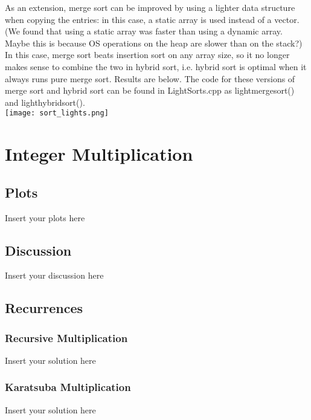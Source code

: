 \documentclass[a4paper]{article}
\begin{document}
As an extension, merge sort can be improved by using a lighter data structure when copying the entries: in this case, a static array is used instead of a vector. (We found that using a static array was faster than using a dynamic array. Maybe this is because OS operations on the heap are slower than on the stack?) In this case, merge sort beats insertion sort on any array size, so it no longer makes sense to combine the two in hybrid sort, i.e. hybrid sort is optimal when it always runs pure merge sort. Results are below. The code for these versions of merge sort and hybrid sort can be found in LightSorts.cpp as lightmergesort() and lighthybridsort().\\

\texttt{[image: sort\_lights.png]}


\section{Integer Multiplication}

\subsection{Plots}

\noindent Insert your plots here

\subsection{Discussion}

\noindent Insert your discussion here

\subsection{Recurrences}

\subsubsection{Recursive Multiplication}

\noindent Insert your solution here

\subsubsection{Karatsuba Multiplication}

\noindent Insert your solution here
\end{document}
